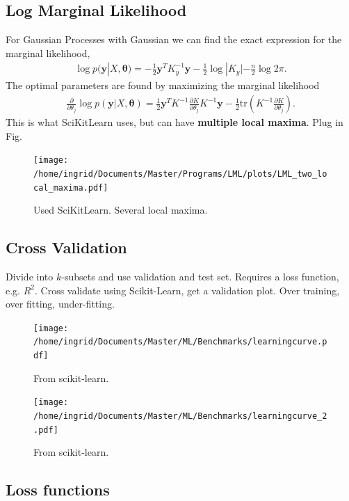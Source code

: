 \documentclass[twoside,english]{uiofysmaster}
\begin{document}
\subsection{Log Marginal Likelihood}

For Gaussian Processes with Gaussian we can find the exact expression for the marginal likelihood,
\begin{align}
\log p(\textbf{y}|X, \boldsymbol{\theta}) = - \frac{1}{2} \textbf{y}^T K_y^{-1} \textbf{y} - \frac{1}{2} \log |K_y| - \frac{n}{2} \log 2 \pi.
\end{align}
The optimal parameters are found by maximizing the marginal likelihood
\begin{align}
\frac{\partial}{\partial \theta_j}
 \log p(\textbf{y}|X, \boldsymbol{\theta}) = \frac{1}{2} \textbf{y}^T K^{-1} \frac{\partial K}{\partial \theta_j} K^{-1} \textbf{y} - \frac{1}{2} \text{tr} (K^{-1} \frac{\partial K}{\partial \theta_j}).
\end{align}
This is what SciKitLearn uses, but can have \textbf{multiple local maxima}. Plug in Fig. 

\begin{figure}
\centering
\texttt{[image: /home/ingrid/Documents/Master/Programs/LML/plots/LML\_two\_local\_maxima.pdf]}
\caption{Used SciKitLearn. Several local maxima.}
\end{figure}


\subsection{Cross Validation}

Divide into $k$-subsets and use validation and test set. Requires a loss function, e.g. $R^2$. Cross validate using Scikit-Learn, get a validation plot. Over training, over fitting, under-fitting.

\begin{figure}
\centering
\texttt{[image: /home/ingrid/Documents/Master/ML/Benchmarks/learningcurve.pdf]}
\caption{From scikit-learn.}
\end{figure}

\begin{figure}
\centering
\texttt{[image: /home/ingrid/Documents/Master/ML/Benchmarks/learningcurve\_2.pdf]}
\caption{From scikit-learn.}
\end{figure}




\subsection{Loss functions}
\end{document}
